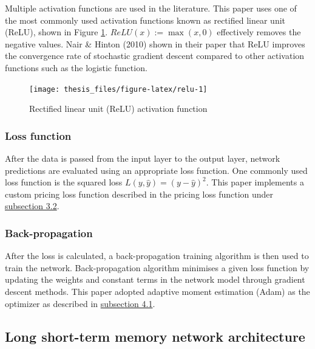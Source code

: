 \documentclass[12pt]{article}
\begin{document}
Multiple activation functions are used in the literature.
This paper uses one of the most commonly
used activation functions known as rectified linear unit
(ReLU), shown in Figure \ref{fig:relu}. \(ReLU(x) := \max(x, 0)\) effectively removes the negative values.
Nair \& Hinton (2010) shown in their paper that ReLU
improves the convergence rate of stochastic gradient descent
compared to other activation functions such as the logistic
function.

\begin{figure}

{\centering \texttt{[image: thesis\_files/figure-latex/relu-1]} 

}

\caption{Rectified linear unit (ReLU) activation function}\label{fig:relu}
\end{figure}

\hypertarget{loss-function}{%
\subsubsection{Loss function}\label{loss-function}}

After the data is passed from the input layer to the output
layer, network predictions are evaluated using an
appropriate loss function.
One commonly used loss function is
the squared loss \(L(y, \hat{y}) = (y-\hat{y})^2\).
This paper implements a custom pricing loss
function described in the pricing loss
function under \protect\hyperlink{loss_function}{subsection 3.2}.

\hypertarget{back-propagation}{%
\subsubsection{Back-propagation}\label{back-propagation}}

After the loss is calculated, a back-propagation training
algorithm is then used to train the network.
Back-propagation algorithm minimises a given loss function
by updating the weights and constant terms in the network model
through gradient descent methods. This paper adopted
adaptive moment estimation (Adam) as the optimizer as
described in \protect\hyperlink{adam}{subsection 4.1}.

\hypertarget{LSTM_model}{%
\subsection{Long short-term memory network architecture}\label{LSTM_model}}
\end{document}
